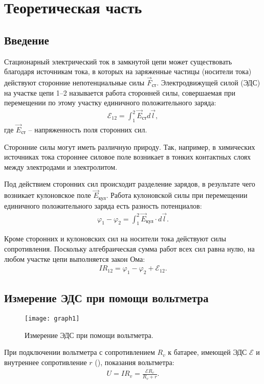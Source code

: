 \section{Теоретическая часть}

\subsection{Введение}
Стационарный электрический ток в замкнутой цепи может существовать благодаря источникам тока, в которых на заряженные частицы (носители тока) действуют сторонние непотенциальные силы $\vec{F}_{\text{ст}}$. Электродвижущей силой (ЭДС) на участке цепи 1--2 называется работа сторонней силы, совершаемая при перемещении по этому участку единичного положительного заряда:
\begin{align} \label{eq:1}
	\mathcal{E}_{12} = \int_{1}^{2} \vec{E}_{\text{ст}} d\vec{l},
\end{align}
где $\vec{E}_{\text{ст}}$ -- напряженность поля сторонних сил.

Сторонние силы могут иметь различную природу. Так, например, в химических источниках тока стороннее силовое поле возникает в тонких контактных слоях между электродами и электролитом.

Под действием сторонних сил происходит разделение зарядов, в результате чего возникает кулоновское поле $\vec{E}_{\text{кул}}$. Работа кулоновской силы при перемещении единичного положительного заряда есть разность потенциалов:
\begin{align} \label{eq:2}
	\varphi_1 - \varphi_2 = \int_{1}^{2} \vec{E}_{\text{кул}} \cdot d\vec{l}.
\end{align}

Кроме сторонних и кулоновских сил на носители тока действуют силы сопротивления. Поскольку алгебраическая сумма работ всех сил равна нулю, на любом участке цепи выполняется закон Ома:
\begin{align} \label{eq:3}
	I R_{12} = \varphi_1 - \varphi_2 + \mathcal{E}_{12}.
\end{align}

\subsection{Измерение ЭДС при помощи вольтметра}
\begin{figure}[H]
	\centering
	\texttt{[image: graph1]}
	\caption{Измерение ЭДС при помощи вольтметра.}
	\label{fig:1}
\end{figure}
При подключении вольтметра с сопротивлением $R_v$ к батарее, имеющей ЭДС $\mathcal{E}$ и внутреннее сопротивление $r$ (), показания вольтметра:
\begin{align} \label{eq:4}
	U = I R_v = \frac{\mathcal{E} R_v}{R_v + r}.
\end{align}

